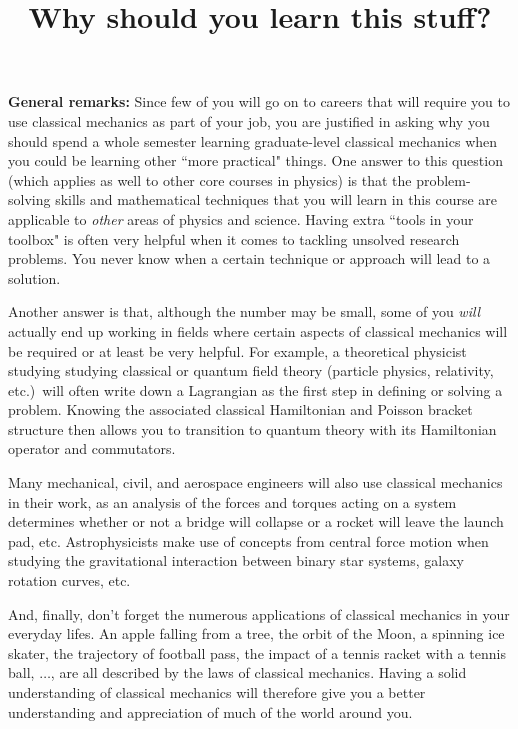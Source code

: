 \documentclass[10pt]{article}
\numberwithin{equation}{section}
\begin{document}
\setlength{\parindent}{0pt}
\setlength{\parskip}{\medskipamount}

\title{Why should you learn this stuff?}
\maketitle
\date{}

{\bf General remarks:}
Since few of you will go on to careers that will 
require you to use classical mechanics as part of your
job, you are justified in asking why you should spend a 
whole semester learning graduate-level classical mechanics
when you could be learning other ``more practical" things.
One answer to this question (which applies as well to 
other core courses in physics) is that the problem-solving 
skills and mathematical techniques that you will learn 
in this course are applicable to {\em other} areas 
of physics and science.
Having extra ``tools in your toolbox" is often very helpful
when it comes to tackling unsolved research problems.
You never know when a certain technique or approach will 
lead to a solution.

Another answer is that, although the number may be small,
some of you {\em will} actually 
end up working in fields where certain aspects of classical 
mechanics will be required or at least be very helpful.
For example, a theoretical physicist studying studying 
classical or quantum field theory (particle physics, 
relativity, etc.)\ will often write 
down a Lagrangian as the first step in defining or 
solving a problem. 
Knowing the associated classical Hamiltonian and 
Poisson bracket structure then allows you to transition 
to quantum theory with its Hamiltonian operator and commutators.

Many mechanical, civil, and aerospace engineers 
will also use classical mechanics in their work, as an analysis 
of the forces and torques acting on a system determines 
whether or not a bridge will collapse or a rocket will leave 
the launch pad, etc.
Astrophysicists make use of concepts from central force 
motion when studying the gravitational interaction between 
binary star systems, galaxy rotation curves, etc.

And, finally, don't forget the numerous applications of
classical mechanics in your everyday lifes.  
An apple falling from a tree, 
the orbit of the Moon, a spinning ice skater,
the trajectory of football pass, the impact of 
a tennis racket with a tennis ball, $\ldots$, are all described 
by the laws of classical mechanics.
Having a solid understanding of classical mechanics will 
therefore give you a better understanding and appreciation 
of much of the world around you.
\end{document}
